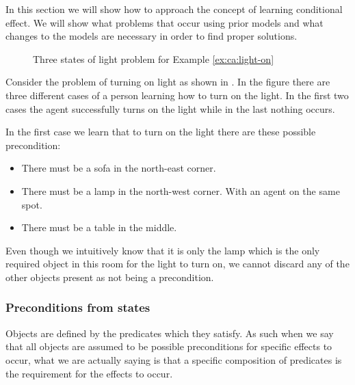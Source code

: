 \documentclass[../Master.tex]{subfiles}
\begin{document}
In this section we will show how to approach the concept of learning conditional effect. We will show what problems that occur using prior models and what changes to the models are necessary in order to find proper solutions.

\begin{figure}


	\caption{\label{fig:ca:house-example}Three states of light problem for Example \ref{ex:ca:light-on}}



\end{figure}

\begin{example}\label{ex:ca:light-on}
Consider the problem of turning on light as shown in .
In the figure there are three different cases of a person learning how to turn on the
light. In the first two cases the agent successfully turns on the light while in the last nothing occurs.

In the first case we learn that to turn on the light there are these possible precondition:
\begin{itemize}
	\item There must be a sofa in the north-east corner.
	\item There must be a lamp in the north-west corner. With an agent on the same spot.
	\item There must be a table in the middle.
\end{itemize}
Even though we intuitively know that it is only the lamp which is the only required object in this room for the light to turn on, we cannot discard any of the other objects present as not being a precondition.
\end{example}

\subsubsection{Preconditions from states}
Objects are defined by the predicates which they satisfy. As such when we say that all objects are assumed to be possible preconditions for specific effects to occur, what we are actually saying is that a specific composition of predicates is the requirement for the effects to occur.
\end{document}
